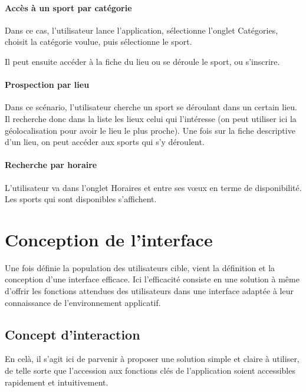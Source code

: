 \documentclass[french, titlepage, 11pt, a4paper]{article}
\begin{document}
        \paragraph{Accès à un sport par catégorie}

            Dans ce cas, l'utilisateur lance l'application, sélectionne l'onglet
            Catégories, choisit la catégorie voulue, puis sélectionne le sport.

            Il peut ensuite accéder à la fiche du lieu ou se déroule le sport, ou s'inscrire.

        \paragraph{Prospection par lieu}

            Dans ce scénario, l'utilisateur cherche un sport se déroulant dans un
            certain lieu. Il recherche donc dans la liste les lieux celui qui
            l'intéresse (on peut utiliser ici la géolocalisation pour avoir le
            lieu le plus proche). Une fois sur la fiche descriptive d'un lieu,
            on peut accéder aux sports qui s'y déroulent.

        \paragraph{Recherche par horaire}

            L'utilisateur va dans l'onglet \og Horaires\fg{} et entre ses v\oe ux
            en terme de disponibilité. Les sports qui sont disponibles s'affichent.

\section{Conception de l'interface}

Une fois définie la population des utilisateurs cible, vient la définition et la
conception d'une interface efficace.
Ici l'efficacité consiste en une solution à même d'offrir les fonctions
attendues des utilisateurs dans une interface adaptée à leur connaissance de
l'environnement applicatif.

	\subsection{Concept d'interaction}

	En celà, il s'agit ici de parvenir à proposer une solution simple et claire à
	utiliser, de telle sorte que l'accession aux fonctions clés de l'application
	soient accessibles rapidement et intuitivement.
\end{document}
